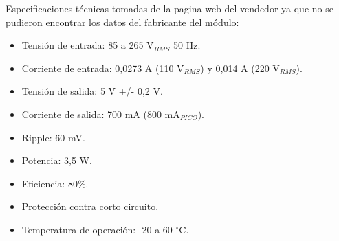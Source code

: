 Especificaciones técnicas tomadas de la pagina web del vendedor ya que no se pudieron encontrar los datos del fabricante del módulo:
\begin{itemize}
\item Tensión de entrada: 85 a 265 V$_{RMS}$ 50 Hz.
\item Corriente de entrada: 0,0273 A (110 V$_{RMS}$) y 0,014 A (220 V$_{RMS}$).
\item Tensión de salida: 5 V +/- 0,2 V.
\item Corriente de salida: 700 mA (800 mA$_{PICO}$).
\item Ripple: 60 mV.
\item Potencia: 3,5 W.
\item Eficiencia: 80\%.
\item Protección contra corto circuito.
\item Temperatura de operación: -20 a 60 $^{\circ}$C.
\end{itemize}


